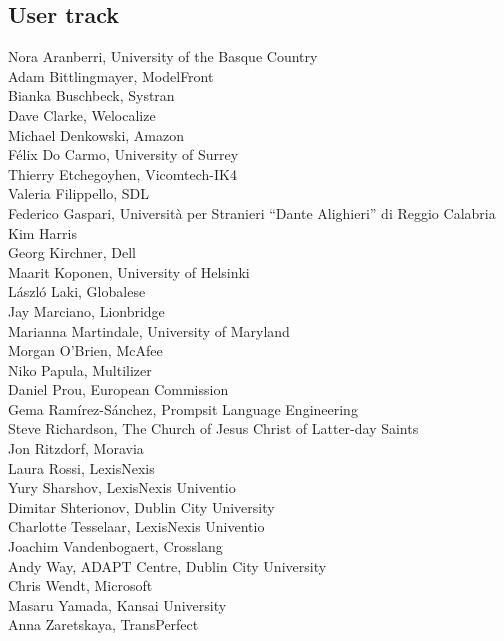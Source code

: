 \documentclass[a4paper,11pt,twoside]{book}
\begin{document}
\pagebreak

\subsection*{User track}
\noindent Nora Aranberri, University of the Basque Country\\
\noindent Adam Bittlingmayer, ModelFront\\
\noindent Bianka Buschbeck, Systran\\
\noindent Dave Clarke, Welocalize\\
\noindent Michael Denkowski, Amazon\\
\noindent Félix Do Carmo, University of Surrey\\
\noindent Thierry Etchegoyhen, Vicomtech-IK4\\
\noindent Valeria Filippello, SDL\\
\noindent Federico Gaspari, Università per Stranieri “Dante Alighieri” di Reggio Calabria\\
\noindent Kim Harris\\
\noindent Georg Kirchner, Dell \\
\noindent Maarit Koponen, University of Helsinki\\
\noindent László Laki, Globalese\\
\noindent Jay Marciano, Lionbridge\\
\noindent Marianna Martindale, University of Maryland\\
\noindent Morgan O’Brien, McAfee\\
\noindent Niko Papula, Multilizer\\
\noindent Daniel Prou, European Commission\\
\noindent Gema Ramírez-Sánchez, Prompsit Language Engineering\\
\noindent Steve Richardson, The Church of Jesus Christ of Latter-day Saints\\
\noindent Jon Ritzdorf, Moravia\\
\noindent Laura Rossi, LexisNexis\\
\noindent Yury Sharshov, LexisNexis Univentio\\
\noindent Dimitar Shterionov, Dublin City University\\
\noindent Charlotte Tesselaar, LexisNexis Univentio\\
\noindent Joachim Vandenbogaert, Crosslang\\
\noindent Andy Way, ADAPT Centre, Dublin City University\\
\noindent Chris Wendt, Microsoft\\
\noindent Masaru Yamada, Kansai University\\
\noindent Anna Zaretskaya, TransPerfect
\end{document}
